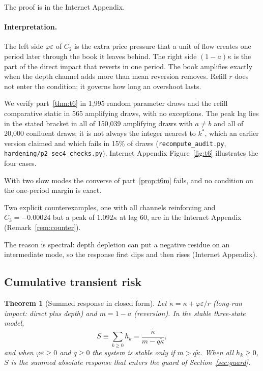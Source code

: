 \documentclass[12pt]{article}
\newtheorem{theorem}{Theorem}[section]
\theoremstyle{definition}
\theoremstyle{remark}
\begin{document}
The proof is in the Internet Appendix.


\paragraph{Interpretation.} The left side $\varphi\varepsilon$ of $C_2$ is the extra price pressure that a unit of flow creates one period later through the book it leaves behind. The right side $(1-a)\kappa$ is the part of the direct impact that reverts in one period. The book amplifies exactly when the depth channel adds more than mean reversion removes. Refill $r$ does not enter the condition; it governs how long an overshoot lasts.

We verify part~\ref{thm:t6} in 1,995 random parameter draws and the refill comparative static in 565 amplifying draws, with no exceptions. The peak lag lies in the stated bracket in all of 150{,}039 amplifying draws with $a\ne b$ and all of 20{,}000 confluent draws; it is not always the integer nearest to $k^*$, which an earlier version claimed and which fails in 15\% of draws (\texttt{recompute\_audit.py}, \texttt{hardening/p2\_sec4\_checks.py}). Internet Appendix Figure~\ref{fig:t6} illustrates the four cases.



With two slow modes the converse of part~\ref{prop:t6m} fails, and no condition on the one-period margin is exact.

Two explicit counterexamples, one with all channels reinforcing and $C_3=-0.00024$ but a peak of $1.092\kappa$ at lag 60, are in the Internet Appendix (Remark~\ref{rem:counter}). 

The reason is spectral: depth depletion can put a negative residue on an intermediate mode, so the response first dips and then rises (Internet Appendix).

\subsection{Cumulative transient risk}

\begin{theorem}[Summed response in closed form]\label{thm:sum}
Let $\tilde\kappa=\kappa+\varphi\varepsilon/r$ (long-run impact: direct plus depth) and $m=1-a$ (reversion). In the stable three-state model,
\[
S\equiv\sum_{k\ge0}h_k=\frac{\tilde\kappa}{m-q\tilde\kappa},
\]
and when $\varphi\varepsilon\ge0$ and $q\ge0$ the system is stable only if $m>q\tilde\kappa$. When all $h_k\ge0$, $S$ is the summed absolute response that enters the guard of Section~\ref{sec:guard}.
\end{theorem}
\end{document}
